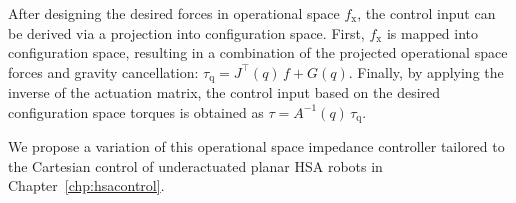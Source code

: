 After designing the desired forces in operational space $f_\mathrm{x}$, the control input can be derived via a projection into configuration space. First, $f_\mathrm{x}$ is mapped into configuration space, resulting in a combination of the projected operational space forces and gravity cancellation: $\tau_\mathrm{q} = J^\top(q) \, f + G(q)$. Finally, by applying the inverse of the actuation matrix, the control input based on the desired configuration space torques is obtained as $\tau = A^{-1}(q) \, \tau_\mathrm{q}$.

We propose a variation of this operational space impedance controller tailored to the Cartesian control of underactuated planar \gls{HSA} robots in Chapter~\ref{chp:hsacontrol}.